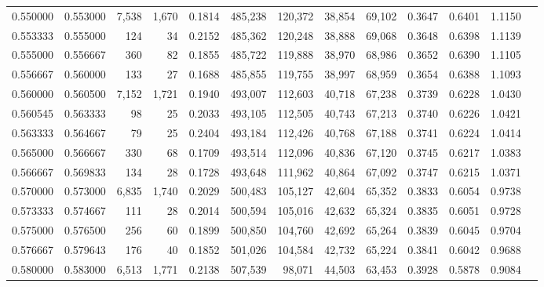 \begin{tabular}{rrrrrrrrrrrrr}
0.550000 & 0.553000 &  7,538 & 1,670 &                                     0.1814 & 485,238 & 120,372 &  38,854 &  69,102 & 0.3647 & 0.6401 & 1.1150 \\
0.553333 & 0.555000 &    124 &    34 &                                     0.2152 & 485,362 & 120,248 &  38,888 &  69,068 & 0.3648 & 0.6398 & 1.1139 \\
0.555000 & 0.556667 &    360 &    82 &                                     0.1855 & 485,722 & 119,888 &  38,970 &  68,986 & 0.3652 & 0.6390 & 1.1105 \\
0.556667 & 0.560000 &    133 &    27 &                                     0.1688 & 485,855 & 119,755 &  38,997 &  68,959 & 0.3654 & 0.6388 & 1.1093 \\
0.560000 & 0.560500 &  7,152 & 1,721 &                                     0.1940 & 493,007 & 112,603 &  40,718 &  67,238 & 0.3739 & 0.6228 & 1.0430 \\
0.560545 & 0.563333 &     98 &    25 &                                     0.2033 & 493,105 & 112,505 &  40,743 &  67,213 & 0.3740 & 0.6226 & 1.0421 \\
0.563333 & 0.564667 &     79 &    25 &                                     0.2404 & 493,184 & 112,426 &  40,768 &  67,188 & 0.3741 & 0.6224 & 1.0414 \\
0.565000 & 0.566667 &    330 &    68 &                                     0.1709 & 493,514 & 112,096 &  40,836 &  67,120 & 0.3745 & 0.6217 & 1.0383 \\
0.566667 & 0.569833 &    134 &    28 &                                     0.1728 & 493,648 & 111,962 &  40,864 &  67,092 & 0.3747 & 0.6215 & 1.0371 \\
0.570000 & 0.573000 &  6,835 & 1,740 &                                     0.2029 & 500,483 & 105,127 &  42,604 &  65,352 & 0.3833 & 0.6054 & 0.9738 \\
0.573333 & 0.574667 &    111 &    28 &                                     0.2014 & 500,594 & 105,016 &  42,632 &  65,324 & 0.3835 & 0.6051 & 0.9728 \\
0.575000 & 0.576500 &    256 &    60 &                                     0.1899 & 500,850 & 104,760 &  42,692 &  65,264 & 0.3839 & 0.6045 & 0.9704 \\
0.576667 & 0.579643 &    176 &    40 &                                     0.1852 & 501,026 & 104,584 &  42,732 &  65,224 & 0.3841 & 0.6042 & 0.9688 \\
0.580000 & 0.583000 &  6,513 & 1,771 &                                     0.2138 & 507,539 &  98,071 &  44,503 &  63,453 & 0.3928 & 0.5878 & 0.9084 \\

\end{tabular}
